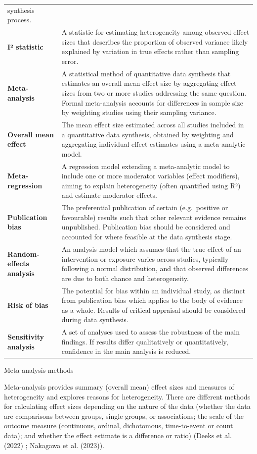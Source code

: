 \documentclass[
  letterpaper,
  DIV=11,
  numbers=noendperiod]{scrreprt}
\begin{document}
\begin{longtable}[]{@{}
  >{\raggedright\arraybackslash}p{}
  >{\raggedright\arraybackslash}p{}@{}}
synthesis process. \\
\textbf{I² statistic} & A statistic for estimating heterogeneity among
observed effect sizes that describes the proportion of observed variance
likely explained by variation in true effects rather than sampling
error. \\
\textbf{Meta-analysis} & A statistical method of quantitative data
synthesis that estimates an overall mean effect size by aggregating
effect sizes from two or more studies addressing the same question.
Formal meta-analysis accounts for differences in sample size by
weighting studies using their sampling variance. \\
\textbf{Overall mean effect} & The mean effect size estimated across all
studies included in a quantitative data synthesis, obtained by weighting
and aggregating individual effect estimates using a meta-analytic
model. \\
\textbf{Meta-regression} & A regression model extending a meta-analytic
model to include one or more moderator variables (effect modifiers),
aiming to explain heterogeneity (often quantified using R²) and estimate
moderator effects. \\
\textbf{Publication bias} & The preferential publication of certain
(e.g.~positive or favourable) results such that other relevant evidence
remains unpublished. Publication bias should be considered and accounted
for where feasible at the data synthesis stage. \\
\textbf{Random-effects analysis} & An analysis model which assumes that
the true effect of an intervention or exposure varies across studies,
typically following a normal distribution, and that observed differences
are due to both chance and heterogeneity. \\
\textbf{Risk of bias} & The potential for bias within an individual
study, as distinct from publication bias which applies to the body of
evidence as a whole. Results of critical appraisal should be considered
during data synthesis. \\
\textbf{Sensitivity analysis} & A set of analyses used to assess the
robustness of the main findings. If results differ qualitatively or
quantitatively, confidence in the main analysis is reduced. \\
\end{longtable}

Meta-analysis methods

Meta-analysis provides summary (overall mean) effect sizes and measures
of heterogeneity and explores reasons for heterogeneity. There are
different methods for calculating effect sizes depending on the nature
of the data (whether the data are comparisons between groups, single
groups, or associations; the scale of the outcome measure (continuous,
ordinal, dichotomous, time-to-event or count data); and whether the
effect estimate is a difference or ratio) (Deeks et al. (2022) ;
{Nakagawa et al.} (2023)).
\end{document}
